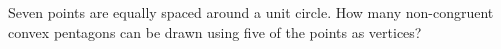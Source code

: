 Seven points are equally spaced around a unit circle. How many non-congruent convex pentagons can be drawn using five of the points as vertices?
